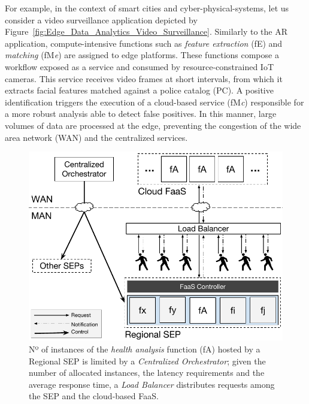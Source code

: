 For example, in the context of smart cities and cyber-physical-systems, let us consider a video surveillance application depicted by Figure~\ref{fig:Edge_Data_Analytics_Video_Surveillance}. Similarly to the AR application, compute-intensive functions such as \textit{feature extraction} (fE) and \textit{matching} (fM\textit{e}) are assigned to edge platforms.
These functions compose a workflow exposed as a service and consumed by resource-constrained IoT cameras. This service receives video frames at short intervals, from which it extracts facial features matched against a police catalog (PC). A positive identification triggers the execution of a cloud-based service (fM\textit{c}) responsible for a more robust analysis able to detect false positives. In this manner, large volumes of data are processed at the edge, preventing the congestion of the wide area network (WAN) and the centralized services.

\begin{figure}[tbp]
	\centering
	\includegraphics[width=\linewidth]{Figs/Edge_Data_Analytics_Personal_Assistant.pdf}
	\caption{Nº of instances of the \textit{health analysis} function (fA) hosted by a Regional SEP is limited by a \textit{Centralized Orchestrator}; given the number of allocated instances, the latency requirements and the average response time, a \textit{Load Balancer} distributes requests among the SEP and the cloud-based FaaS.}
	\label{fig:Edge_Data_Analytics_Personal_Assistant}
\end{figure}

